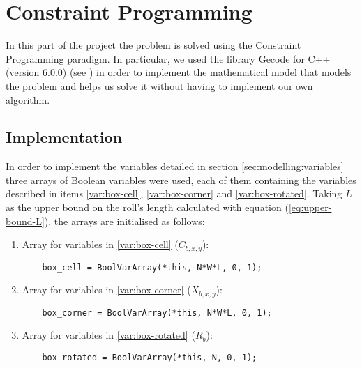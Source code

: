\section{Constraint Programming}
\label{sec:constraint-programming}

In this part of the project the problem is solved using the Constraint Programming
paradigm. In particular, we used the library Gecode for C++ (version 6.0.0)
(see \cite{GecodeWEB}) in order to implement the mathematical model that models
the problem and helps us solve it without having to implement our own algorithm.

\subsection{Implementation}
\label{sec:constraint-programming:implementation}

In order to implement the variables detailed in section \ref{sec:modelling:variables}
three arrays of Boolean variables were used, each of them containing the variables described
in items \ref{var:box-cell}, \ref{var:box-corner} and \ref{var:box-rotated}. Taking
$L$ as the upper bound on the roll's length calculated with equation (\ref{eq:upper-bound-L}),
the arrays are initialised as follows:

\begin{enumerate}
	\item Array for variables in \ref{var:box-cell} ($C_{b,x,y}$):
    
	{\NOINDENT \begin{lstlisting}
	box_cell = BoolVarArray(*this, N*W*L, 0, 1);
	\end{lstlisting}}
    
	\item Array for variables in \ref{var:box-corner} ($X_{b,x,y}$):
    
	{\NOINDENT \begin{lstlisting}
	box_corner = BoolVarArray(*this, N*W*L, 0, 1);
	\end{lstlisting}}
    
	\item Array for variables in \ref{var:box-rotated} ($R_b$):
    
	{\NOINDENT \begin{lstlisting}
	box_rotated = BoolVarArray(*this, N, 0, 1);
	\end{lstlisting}}
    
\end{enumerate}

